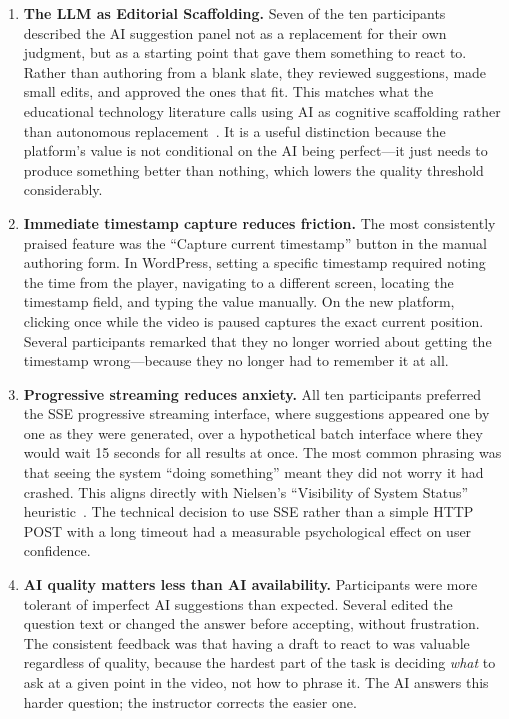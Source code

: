 \begin{enumerate}
    \item \textbf{The LLM as Editorial Scaffolding.} Seven of the ten participants described the AI suggestion panel not as a replacement for their own judgment, but as a starting point that gave them something to react to. Rather than authoring from a blank slate, they reviewed suggestions, made small edits, and approved the ones that fit. This matches what the educational technology literature calls using AI as cognitive scaffolding rather than autonomous replacement~\cite{hwang2020}. It is a useful distinction because the platform's value is not conditional on the AI being perfect---it just needs to produce something better than nothing, which lowers the quality threshold considerably.

    \item \textbf{Immediate timestamp capture reduces friction.} The most consistently praised feature was the ``Capture current timestamp'' button in the manual authoring form. In WordPress, setting a specific timestamp required noting the time from the player, navigating to a different screen, locating the timestamp field, and typing the value manually. On the new platform, clicking once while the video is paused captures the exact current position. Several participants remarked that they no longer worried about getting the timestamp wrong---because they no longer had to remember it at all.

    \item \textbf{Progressive streaming reduces anxiety.} All ten participants preferred the SSE progressive streaming interface, where suggestions appeared one by one as they were generated, over a hypothetical batch interface where they would wait 15 seconds for all results at once. The most common phrasing was that seeing the system ``doing something'' meant they did not worry it had crashed. This aligns directly with Nielsen's ``Visibility of System Status'' heuristic~\cite{nielsen1994}. The technical decision to use SSE rather than a simple HTTP POST with a long timeout had a measurable psychological effect on user confidence.

    \item \textbf{AI quality matters less than AI availability.} Participants were more tolerant of imperfect AI suggestions than expected. Several edited the question text or changed the answer before accepting, without frustration. The consistent feedback was that having a draft to react to was valuable regardless of quality, because the hardest part of the task is deciding \emph{what} to ask at a given point in the video, not how to phrase it. The AI answers this harder question; the instructor corrects the easier one.


\end{enumerate}
